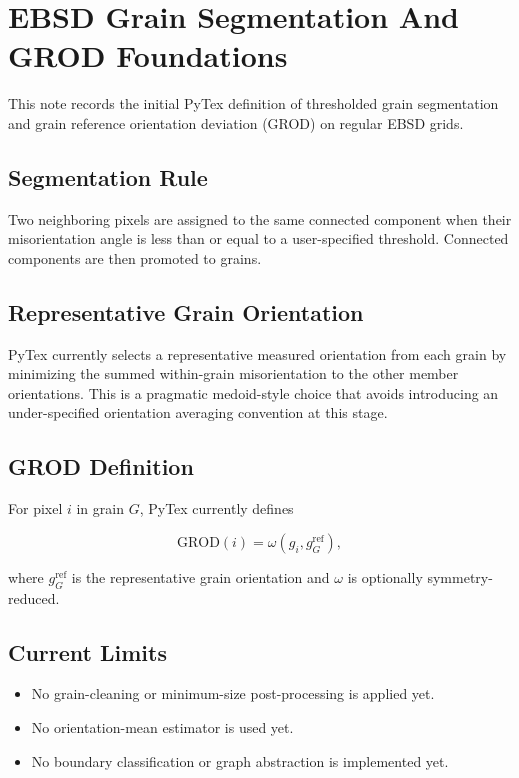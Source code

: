 \section{EBSD Grain Segmentation And GROD Foundations}

This note records the initial PyTex definition of thresholded grain segmentation and grain reference orientation deviation (GROD) on regular EBSD grids.

\subsection{Segmentation Rule}

Two neighboring pixels are assigned to the same connected component when their misorientation angle is less than or equal to a user-specified threshold. Connected components are then promoted to grains.

\subsection{Representative Grain Orientation}

PyTex currently selects a representative measured orientation from each grain by minimizing the summed within-grain misorientation to the other member orientations. This is a pragmatic medoid-style choice that avoids introducing an under-specified orientation averaging convention at this stage.

\subsection{GROD Definition}

For pixel $i$ in grain $G$, PyTex currently defines

\[
\mathrm{GROD}(i) = \omega(g_i, g_G^\mathrm{ref}),
\]

where $g_G^\mathrm{ref}$ is the representative grain orientation and $\omega$ is optionally symmetry-reduced.

\subsection{Current Limits}

\begin{itemize}
  \item No grain-cleaning or minimum-size post-processing is applied yet.
  \item No orientation-mean estimator is used yet.
  \item No boundary classification or graph abstraction is implemented yet.
\end{itemize}
